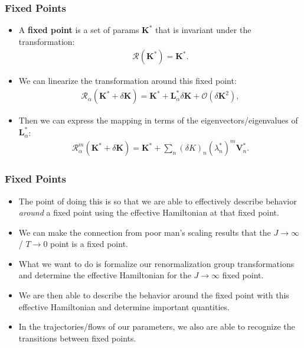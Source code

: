 \documentclass{beamer}
\newcommand{\vv}[1]{\mathbf{\bm{#1}}}
\begin{document}
\begin{frame}
  \frametitle{Fixed Points}

  \begin{itemize}
  \item A \textbf{fixed point} is a set of params $\vv{K}^*$ that is invariant under the transformation:
    \begin{gather*}
      \mathcal{R}(\vv{K}^*) = \vv{K}^*.
    \end{gather*}
  \item We can linearize the transformation around this fixed point:
    \begin{gather*}
      \mathcal{R}_\alpha(\vv{K}^* + \delta\vv{K}) = \vv{K}^* + \vv{L}^*_\alpha \delta\vv{K} + \mathcal{O}(\delta\vv{K}^2),
    \end{gather*}
  \item Then we can express the mapping in terms of the eigenvectors/eigenvalues of $\vv{L}^*_\alpha$:
    \begin{gather*}
      \mathcal{R}^m_\alpha(\vv{K}^* + \delta\vv{K}) = \vv{K}^* + \sum_n (\delta K)_n(\lambda^*_n)^m \vv{V}^*_n.
    \end{gather*}
  \end{itemize}
\end{frame}


\begin{frame}
  \frametitle{Fixed Points}

  \begin{itemize}
  \item The point of doing this is so that we are able to effectively describe behavior \textit{around} a fixed point using the effective Hamiltonian at that fixed point.
  \item We can make the connection from poor man's scaling results that the $J \rightarrow \infty$ / $T \rightarrow 0$ point is a fixed point.
  \item What we want to do is formalize our renormalization group transformations and determine the effective Hamiltonian for the $J \rightarrow \infty$ fixed point.
  \item We are then able to describe the behavior around the fixed point with this effective Hamiltonian and determine important quantities.
  \item In the trajectories/flows of our parameters, we also are able to recognize the transitions between fixed points.
  \end{itemize}
\end{frame}
\end{document}
